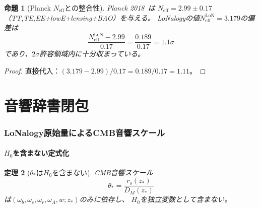 \documentclass[12pt]{article}
\theoremstyle{plain}
\newtheorem{theorem}{定理}[section]
\newtheorem{proposition}[theorem]{命題}
\theoremstyle{definition}
\numberwithin{equation}{section}
\newcommand{\eff}{\mathrm{eff}}
\newcommand{\LoN}{\mathrm{LoN}}
\begin{document}
\begin{proposition}[Planck $N_{\eff}$との整合性]\label{prop:Neffbound}
Planck 2018~\cite{Planck2018}は
$N_{\eff}=2.99\pm0.17$%
\linebreak
（TT,\allowbreak TE,\allowbreak EE+\allowbreak lowE+\allowbreak lensing+\allowbreak BAO）を与える。
LoNalogyの値$N_{\eff}^{\LoN}=3.179$の偏差は
\begin{equation}
\frac{N_{\eff}^{\LoN}-2.99}{0.17} = \frac{0.189}{0.17} = 1.1\sigma
\end{equation}
であり、$2\sigma$許容領域内に十分収まっている。
\end{proposition}

\begin{proof}
直接代入：$(3.179-2.99)/0.17=0.189/0.17=1.11$。
\end{proof}


\part{音響辞書閉包}

\section{LoNalogy原始量によるCMB音響スケール}\label{sec:acoustic}

\subsection{$H_0$を含まない定式化}

\begin{theorem}[$\theta_*$は$H_0$を含まない]\label{thm:thetafree}
CMB音響スケール
\begin{equation}
\theta_* = \frac{r_s(z_*)}{D_M(z_*)}
\end{equation}
は$(\omega_b,\omega_c,\omega_r,\omega_\Lambda,w;z_*)$のみに依存し、
$H_0$を独立変数として含まない。
\end{theorem}
\end{document}
